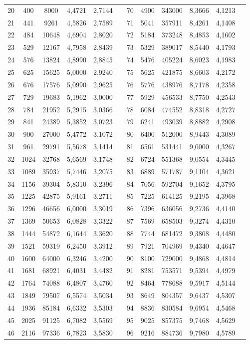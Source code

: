\begin{longtable}{p{.17\linewidth}*{11}{S}}
20&400&8000&4,4721&2,7144&&70&4900&343000&8,3666&4,1213\\
21&441&9261&4,5826&2,7589&&71&5041&357911&8,4261&4,1408\\
22&484&10648&4,6904&2,8020&&72&5184&373248&8,4853&4,1602\\
23&529&12167&4,7958&2,8439&&73&5329&389017&8,5440&4,1793\\
24&576&13824&4,8990&2,8845&&74&5476&405224&8,6023&4,1983\\
25&625&15625&5,0000&2,9240&&75&5625&421875&8,6603&4,2172\\
26&676&17576&5,0990&2,9625&&76&5776&438976&8,7178&4,2358\\
27&729&19683&5,1962&3,0000&&77&5929&456533&8,7750&4,2543\\
28&784&21952&5,2915&3,0366&&78&6084&474552&8,8318&4,2727\\
29&841&24389&5,3852&3,0723&&79&6241&493039&8,8882&4,2908\\
30&900&27000&5,4772&3,1072&&80&6400&512000&8,9443&4,3089\\
31&961&29791&5,5678&3,1414&&81&6561&531441&9,0000&4,3267\\
32&1024&32768&5,6569&3,1748&&82&6724&551368&9,0554&4,3445\\
33&1089&35937&5,7446&3,2075&&83&6889&571787&9,1104&4,3621\\
34&1156&39304&5,8310&3,2396&&84&7056&592704&9,1652&4,3795\\
35&1225&42875&5,9161&3,2711&&85&7225&614125&9,2195&4,3968\\
36&1296&46656&6,0000&3,3019&&86&7396&636056&9,2736&4,4140\\
37&1369&50653&6,0828&3,3322&&87&7569&658503&9,3274&4,4310\\
38&1444&54872&6,1644&3,3620&&88&7744&681472&9,3808&4,4480\\
39&1521&59319&6,2450&3,3912&&89&7921&704969&9,4340&4,4647\\
40&1600&64000&6,3246&3,4200&&90&8100&729000&9,4868&4,4814\\
41&1681&68921&6,4031&3,4482&&91&8281&753571&9,5394&4,4979\\
42&1764&74088&6,4807&3,4760&&92&8464&778688&9,5917&4,5144\\
43&1849&79507&6,5574&3,5034&&93&8649&804357&9,6437&4,5307\\
44&1936&85184&6,6332&3,5303&&94&8836&830584&9,6954&4,5468\\
45&2025&91125&6,7082&3,5569&&95&9025&857375&9,7468&4,5629\\
46&2116&97336&6,7823&3,5830&&96&9216&884736&9,7980&4,5789\\

\end{longtable}
